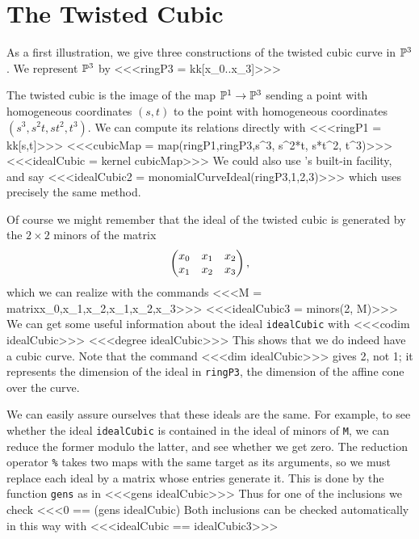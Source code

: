 \section{The Twisted Cubic}

As a first illustration, we give three constructions
of the twisted cubic
curve in $\P^3$. We represent $\P^3$ by
<<<ringP3 = kk[x_0..x_3]>>>

The twisted cubic is the image of the map $\P^1\to\P^3$ sending
a point with homogeneous coordinates $(s,t)$ to the point with
homogeneous coordinates $(s^3, s^2t, st^2, t^3)$. We can compute
its relations directly with
<<<ringP1 = kk[s,t]>>>
<<<cubicMap = map(ringP1,ringP3,{s^3, s^2*t, s*t^2, t^3})>>>
%
<<<idealCubic = kernel cubicMap>>>
We could also use \Mtwo's built-in facility, and say
<<<idealCubic2 = monomialCurveIdeal(ringP3,{1,2,3})>>>
which uses precisely the same method.

Of course we might remember that the ideal of the twisted
cubic is generated by the $2\times 2$ minors of the 
matrix
$$\begin{pmatrix}
x_0&x_1&x_2\cr
x_1&x_2&x_3
\end{pmatrix},
$$
which we can realize with the commands
<<<M = matrix{{x_0,x_1,x_2},{x_1,x_2,x_3}}>>>
%
<<<idealCubic3 = minors(2, M)>>>
We can get some useful information about the ideal
{\tt idealCubic} with
%
<<<codim idealCubic>>>
%
<<<degree idealCubic>>>
This shows that we do indeed have a cubic curve. Note that the
command
%
<<<dim idealCubic>>>
gives 2, not 1; it represents the dimension of the ideal 
in {\tt ringP3}, the dimension of the affine cone over the
curve.

We can easily assure ourselves that these ideals are the same.
{}For example, to see whether the ideal {\tt idealCubic}
is contained in the ideal of minors of {\tt M}, we can
reduce the former modulo the latter, and see whether 
we get zero. The reduction operator {\tt \%} takes two
maps with the same target as its arguments, so
we must replace each ideal by a matrix whose entries 
generate it. This is done by the function {\tt gens} as in
%
<<<gens idealCubic>>>
Thus for one of the inclusions we check
\indexcmd{\%}%
%
<<<0 == (gens idealCubic)%
Both inclusions can be checked automatically in this way
with
<<<idealCubic == idealCubic3>>>




